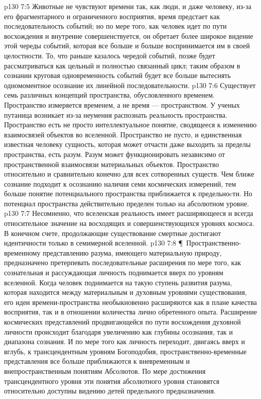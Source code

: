 \vs p130 7:5 Животные не чувствуют времени так, как люди, и даже человеку, из\hyp{}за его фрагментарного и ограниченного восприятия, время предстает как последовательность событий; но по мере того, как человек идет по пути восхождения и внутренне совершенствуется, он обретает более широкое видение этой череды событий, которая все больше и больше воспринимается им в своей целостности. То, что раньше казалось чередой событий, позже будет рассматриваться как цельный и полностью связанный цикл; таким образом в сознании круговая одновременность событий будет все больше вытеснять одномоментное осознание их линейной последовательности.
\vs p130 7:6 Существует семь различных концепций пространства, обусловленного временем. Пространство измеряется временем, а не время --- пространством. У ученых путаница возникает из\hyp{}за неумения распознать реальность пространства. Пространство есть не просто интеллектуальное понятие, сводящееся к изменению взаимосвязей объектов во вселенной. Пространство не пусто, и единственная известная человеку сущность, которая может отчасти даже выходить за пределы пространства, есть разум. Разум может функционировать независимо от пространственной взаимосвязи материальных объектов. Пространство относительно и сравнительно конечно для всех сотворенных существ. Чем ближе сознание подходит к осознанию наличия семи космических измерений, тем больше понятие потенциального пространства приближается к предельноcти. Но потенциал пространства действительно пределен только на абсолютном уровне.
\vs p130 7:7 Несомненно, что вселенская реальность имеет расширяющееся и всегда относительное значение на восходящих и совершенствующихся уровнях космоса. В конечном счете, продолжающие существование смертные достигают идентичности только в семимерной вселенной.
\vs p130 7:8 \P\ Пространственно\hyp{}временному представлению разума, имеющего материальную природу, предназначено претерпевать последовательные расширения по мере того, как сознательная и рассуждающая личность поднимается вверх по уровням вселенной. Когда человек поднимается на такую ступень развития разума, которая находится между материальным и духовным уровнями существования, его идеи времени\hyp{}пространства необыкновенно расширяются как в плане качества восприятия, так и в отношении количества лично обретенного опыта. Расширение космических представлений продвигающейся по пути восхождения духовной личности происходит благодаря увеличению как глубины осознания, так и диапазона сознания. И по мере того как личность переходит, двигаясь вверх и вглубь, к трансцендентным уровням Богоподобия, пространственно\hyp{}временные представления все больше приближаются к вневременным и внепространственным понятиям Абсолютов. По мере достижения трансцендентного уровня эти понятия абсолютного уровня становятся относительно доступны видению детей предельного предназначения.

